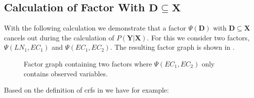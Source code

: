 \subsection{Calculation of Factor With $\mathbf{D}\subseteq\mathbf{X}$}\label{app:subsec-gd-example-calculation}
With the following calculation we demonstrate that a \gls{factor} $\Psi(\mathbf{D})$ with $\mathbf{D}\subseteq\mathbf{X}$ cancels out during the calculation of $P(\mathbf{Y}|\mathbf{X})$.
For this we consider two factors, $\Psi(LN_1,EC_1)$ and $\Psi(EC_1,EC_2)$.
The resulting \gls{factor graph} is shown in .
\begin{figure}[H]
\centering

\caption{%
  Factor graph containing two factors where $\Psi(EC_1,EC_2)$ only contains \glspl{observed variable}.
}
\label{fig:example-x-only-factor-graph}
\end{figure}
Based on the definition of \glspl{crf} in  we have for example:
